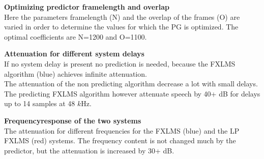 \large

\begin{minipage}{.4\columnwidth}
	 	\textbf{Optimizing predictor framelength and overlap}\\
		Here the parameters framelength (N) and the overlap of the frames (O) are varied in order to determine the values for which the PG is optimized. The optimal coefficients are N=1200 and O=1100.
	\label{fig:HammingNOP10}
\end{minipage}%
\hspace{4mm}
\begin{minipage}{0.5\columnwidth}
	
\end{minipage}

\vspace{4mm}
\begin{minipage}{.4\columnwidth}
	\textbf{Attenuation for different system delays}\\
	 If no system delay is present no prediction is needed, because the FXLMS algorithm (blue) achieves infinite attenuation.\\ 
	 The attenuation of the non predicting algorithm decrease a lot with small delays. The predicting FXLMS algorithm however attenuate speech by 40+ dB for delays up to 14 samples at 48 $k$Hz.
\end{minipage}%
\hspace{4mm}
\begin{minipage}{0.5\columnwidth}
	
\end{minipage}
\vspace{4mm}

\begin{minipage}{.4\columnwidth}
	\textbf{Frequencyresponse of the two systems}\\
The attenuation for different frequencies for the FXLMS (blue) and the LP FXLMS (red) systems. The frequency content is not changed much by the predictor, but the attenuation is increased by 30+ dB. 
\end{minipage}%
\hspace{4mm}
\begin{minipage}{0.5\columnwidth}
	
\end{minipage}


